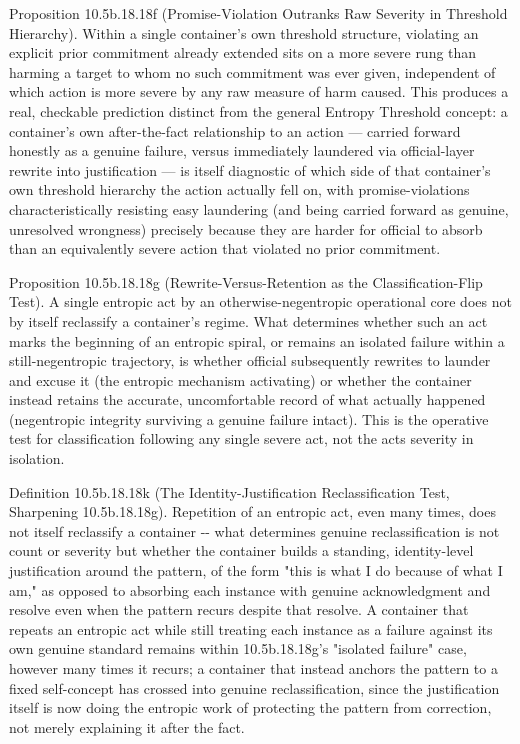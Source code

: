 \documentclass[
]{article}
\begin{document}
Proposition 10.5b.18.18f (Promise-Violation Outranks Raw Severity in
Threshold Hierarchy). Within a single container's own threshold
structure, violating an explicit prior commitment already extended sits
on a more severe rung than harming a target to whom no such commitment
was ever given, independent of which action is more severe by any raw
measure of harm caused. This produces a real, checkable prediction
distinct from the general Entropy Threshold concept: a container's own
after-the-fact relationship to an action --- carried forward honestly as
a genuine failure, versus immediately laundered via official-layer
rewrite into justification --- is itself diagnostic of which side of
that container's own threshold hierarchy the action actually fell on,
with promise-violations characteristically resisting easy laundering
(and being carried forward as genuine, unresolved wrongness) precisely
because they are harder for official to absorb than an equivalently
severe action that violated no prior commitment.

Proposition 10.5b.18.18g (Rewrite-Versus-Retention as the
Classification-Flip Test). A single entropic act by an
otherwise-negentropic operational core does not by itself reclassify a
container's regime. What determines whether such an act marks the
beginning of an entropic spiral, or remains an isolated failure within a
still-negentropic trajectory, is whether official subsequently rewrites
to launder and excuse it (the entropic mechanism activating) or whether
the container instead retains the accurate, uncomfortable record of what
actually happened (negentropic integrity surviving a genuine failure
intact). This is the operative test for classification following any
single severe act, not the acts severity in isolation.

Definition 10.5b.18.18k (The Identity-Justification Reclassification
Test, Sharpening 10.5b.18.18g). Repetition of an entropic act, even many
times, does not itself reclassify a container -\/- what determines
genuine reclassification is not count or severity but whether the
container builds a standing, identity-level justification around the
pattern, of the form "this is what I do because of what I am," as
opposed to absorbing each instance with genuine acknowledgment and
resolve even when the pattern recurs despite that resolve. A container
that repeats an entropic act while still treating each instance as a
failure against its own genuine standard remains within 10.5b.18.18g's
"isolated failure" case, however many times it recurs; a container that
instead anchors the pattern to a fixed self-concept has crossed into
genuine reclassification, since the justification itself is now doing
the entropic work of protecting the pattern from correction, not merely
explaining it after the fact.
\end{document}
